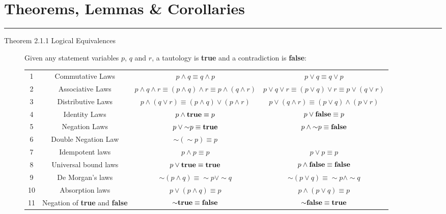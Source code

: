 \documentclass{article}
\begin{document}
\newpage
\section*{Theorems, Lemmas \& Corollaries}
\hrule
\vspace{0.3cm}
\begin{description}

    \item[Theorem 2.1.1 Logical Equivalences]Given any statement variables $p$, $q$ and $r$, a tautology is \textbf{true} and a contradiction is \textbf{false}: 
    \begin{table}[h]
        \centering
        {
        \begin{tabular}{|c|c|c|c|}
            \hline
             1 & Commutative Laws & $p \wedge q\equiv q\wedge p$ & $p \vee q\equiv q\vee p$ \\
             2 & Associative Laws & $p\wedge q\wedge r\equiv (p\wedge q)\wedge r\equiv p\wedge(q\wedge r)$ & $p\vee q\vee r\equiv (p\vee q)\vee r\equiv p\vee(q\vee r)$ \\
             3 & Distributive Laws & $p\wedge (q\vee r)\equiv(p\wedge q)\vee(p\wedge r)$ & $p\vee (q\wedge r)\equiv(p\vee q)\wedge(p\vee r)$ \\ 
             4 & Identity Laws & $p\wedge\text{\textbf{true}}\equiv p$ & $p\vee\text{\textbf{false}}\equiv p$ \\
             5 & Negation Laws & $p\vee{\sim} p\equiv\text{\textbf{true}}$ & $p\wedge{\sim} p\equiv\text{\textbf{false}}$ \\
             6 & Double Negation Law & ${\sim}({\sim} p)\equiv p$ &  \\
             7 & Idempotent laws & $p\wedge p\equiv p$ & $p\vee p\equiv p$ \\
             8 & Universal bound laws & $p\vee\text{\textbf{true}}\equiv\text{\textbf{true}}$ & $p\wedge\text{\textbf{false}}\equiv\text{\textbf{false}}$ \\
             9 & De Morgan's laws & ${\sim}(p\wedge q)\equiv{\sim} p\vee{\sim} q$ & ${\sim}(p\vee q)\equiv{\sim} p\wedge{\sim} q$ \\
             10 & Absorption laws & $p\vee(p\wedge q)\equiv p$ & $p\wedge(p\vee q)\equiv p$ \\
             11 & Negation of \textbf{true} and \textbf{false} & ${\sim}\text{\textbf{true}}\equiv\text{\textbf{false}}$ & ${\sim}\text{\textbf{false}}\equiv\text{\textbf{true}}$ \\

\end{tabular}}
\end{table}
\end{description}
\end{document}
